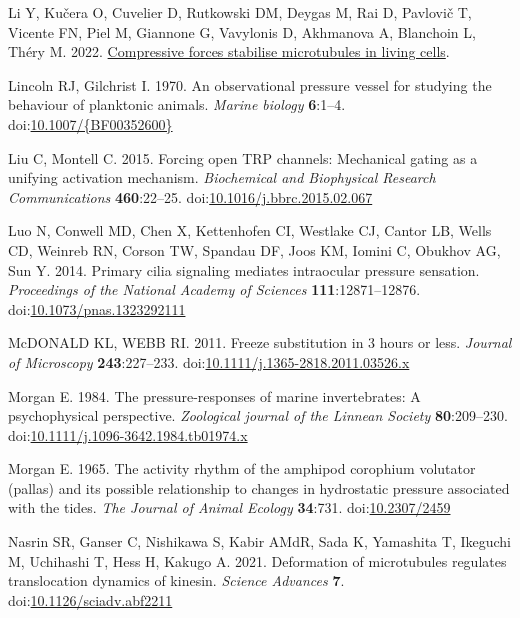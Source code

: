 \documentclass[
  11pt,
]{article}
\newlength{\cslhangindent}
\newenvironment{CSLReferences}[2] %
 {\begin{list}{}{%
  \setlength{\itemindent}{0pt}
  \setlength{\leftmargin}{0pt}
  \setlength{\parsep}{0pt}
  \ifodd #1
   \setlength{\leftmargin}{\cslhangindent}
   \setlength{\itemindent}{-1\cslhangindent}
  \fi
  \setlength{\itemsep}{#2\baselineskip}}}
 {\end{list}}
\begin{document}
\begin{CSLReferences}{1}{0}
Li Y, Kučera O, Cuvelier D, Rutkowski DM, Deygas M, Rai D, Pavlovič T,
Vicente FN, Piel M, Giannone G, Vavylonis D, Akhmanova A, Blanchoin L,
Théry M. 2022.
\href{http://dx.doi.org/10.1101/2022.02.07.479347}{Compressive forces
stabilise microtubules in living cells}.

Lincoln RJ, Gilchrist I. 1970. An observational pressure vessel for
studying the behaviour of planktonic animals. \emph{Marine biology}
\textbf{6}:1--4.
doi:\href{https://doi.org/10.1007/\%7BBF00352600\%7D}{10.1007/\{BF00352600\}}

Liu C, Montell C. 2015. Forcing open TRP channels: Mechanical gating as
a unifying activation mechanism. \emph{Biochemical and Biophysical
Research Communications} \textbf{460}:22--25.
doi:\href{https://doi.org/10.1016/j.bbrc.2015.02.067}{10.1016/j.bbrc.2015.02.067}

Luo N, Conwell MD, Chen X, Kettenhofen CI, Westlake CJ, Cantor LB, Wells
CD, Weinreb RN, Corson TW, Spandau DF, Joos KM, Iomini C, Obukhov AG,
Sun Y. 2014. Primary cilia signaling mediates intraocular pressure
sensation. \emph{Proceedings of the National Academy of Sciences}
\textbf{111}:12871--12876.
doi:\href{https://doi.org/10.1073/pnas.1323292111}{10.1073/pnas.1323292111}

McDONALD KL, WEBB RI. 2011. Freeze substitution in 3 hours or less.
\emph{Journal of Microscopy} \textbf{243}:227--233.
doi:\href{https://doi.org/10.1111/j.1365-2818.2011.03526.x}{10.1111/j.1365-2818.2011.03526.x}

Morgan E. 1984. The pressure-responses of marine invertebrates: A
psychophysical perspective. \emph{Zoological journal of the Linnean
Society} \textbf{80}:209--230.
doi:\href{https://doi.org/10.1111/j.1096-3642.1984.tb01974.x}{10.1111/j.1096-3642.1984.tb01974.x}

Morgan E. 1965. The activity rhythm of the amphipod corophium volutator
(pallas) and its possible relationship to changes in hydrostatic
pressure associated with the tides. \emph{The Journal of Animal Ecology}
\textbf{34}:731. doi:\href{https://doi.org/10.2307/2459}{10.2307/2459}

Nasrin SR, Ganser C, Nishikawa S, Kabir AMdR, Sada K, Yamashita T,
Ikeguchi M, Uchihashi T, Hess H, Kakugo A. 2021. Deformation of
microtubules regulates translocation dynamics of kinesin. \emph{Science
Advances} \textbf{7}.
doi:\href{https://doi.org/10.1126/sciadv.abf2211}{10.1126/sciadv.abf2211}


\end{CSLReferences}
\end{document}
